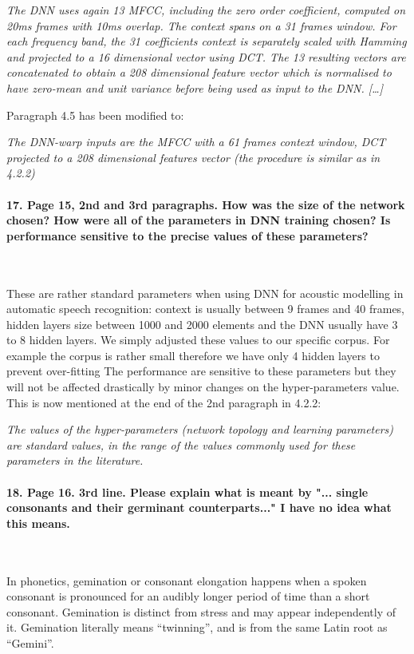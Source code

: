 \documentclass[]{article}
\begin{document}
\textit{The DNN  uses again  13 MFCC, including  the zero  order coefficient, computed on 20ms  frames with 10ms overlap. The context spans on a 31 frames  window. For each frequency band, the 31 coefficients context is separately scaled with Hamming and projected to a 16 dimensional vector using DCT. The 13 resulting vectors are concatenated to obtain a 208 dimensional feature  vector which is normalised to have zero-mean and unit variance before being used as input to the DNN. [\dots]}

Paragraph 4.5 has been modified to:

\textit{The DNN-warp inputs are the MFCC with a 61 frames context window, DCT projected to a 208 dimensional features vector (the procedure is similar as in 4.2.2)}

\paragraph{17. Page 15, 2nd and 3rd paragraphs. How was the size of the network chosen? How were all of the parameters in DNN training chosen? Is performance sensitive to the precise values of these parameters?}

~

These are rather standard parameters when using DNN for acoustic modelling in automatic speech recognition: context is usually between 9 frames and 40 frames, hidden layers size between 1000 and 2000 elements and the DNN usually have 3 to 8 hidden layers. We simply adjusted these values to our specific corpus. For example the corpus is rather small therefore we have only 4 hidden layers to prevent over-fitting The performance are sensitive to these parameters but they will not be affected drastically by minor changes on the hyper-parameters value. This is now mentioned at the end of the 2nd paragraph in 4.2.2:

\textit{The values of the hyper-parameters (network topology and learning parameters) are standard values, in the range of the values commonly used for these parameters in the literature.} 

\paragraph{18. Page 16. 3rd line. Please explain what is meant by "... single consonants and their germinant counterparts..." I have no idea what this means.}

~

In phonetics, gemination or consonant elongation happens when a spoken
consonant is  pronounced for an audibly  longer period of  time than a
short  consonant. Gemination is  distinct from  stress and  may appear
independently of  it. Gemination literally means  ``twinning'', and is
from the same Latin root as ``Gemini''.
\end{document}

